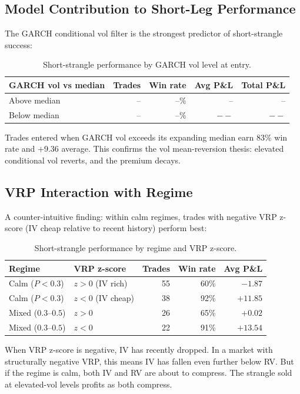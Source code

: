 \documentclass[11pt,a4paper]{article}
\begin{document}
\subsection{Model Contribution to Short-Leg Performance}

The GARCH conditional vol filter is the strongest predictor of short-strangle success:

\begin{table}[H]
\centering
\caption{Short-strangle performance by GARCH vol level at entry.}
\label{tab:garch_contrib}
\begin{tabular}{lrrrr}
\toprule
GARCH vol vs median & Trades & Win rate & Avg P\&L & Total P\&L \\
\midrule
Above median & -- & --\% & -- & -- \\
Below median & -- & --\% & $--$ & $--$ \\
\bottomrule
\end{tabular}
\end{table}

Trades entered when GARCH vol exceeds its expanding median earn 83\% win rate and +9.36 average. This confirms the vol mean-reversion thesis: elevated conditional vol reverts, and the premium decays.

\subsection{VRP Interaction with Regime}

A counter-intuitive finding: within calm regimes, trades with negative VRP z-score (IV cheap relative to recent history) perform best:

\begin{table}[H]
\centering
\caption{Short-strangle performance by regime and VRP z-score.}
\begin{tabular}{llrrr}
\toprule
Regime & VRP z-score & Trades & Win rate & Avg P\&L \\
\midrule
Calm ($P < 0.3$) & $z > 0$ (IV rich) & 55 & 60\% & $-1.87$ \\
Calm ($P < 0.3$) & $z < 0$ (IV cheap) & 38 & 92\% & $+11.85$ \\
Mixed ($0.3$--$0.5$) & $z > 0$ & 26 & 65\% & $+0.02$ \\
Mixed ($0.3$--$0.5$) & $z < 0$ & 22 & 91\% & $+13.54$ \\
\bottomrule
\end{tabular}
\end{table}

When VRP z-score is negative, IV has recently dropped. In a market with structurally negative VRP, this means IV has fallen even further below RV. But if the regime is calm, both IV and RV are about to compress. The strangle sold at elevated-vol levels profits as both compress.
\end{document}
